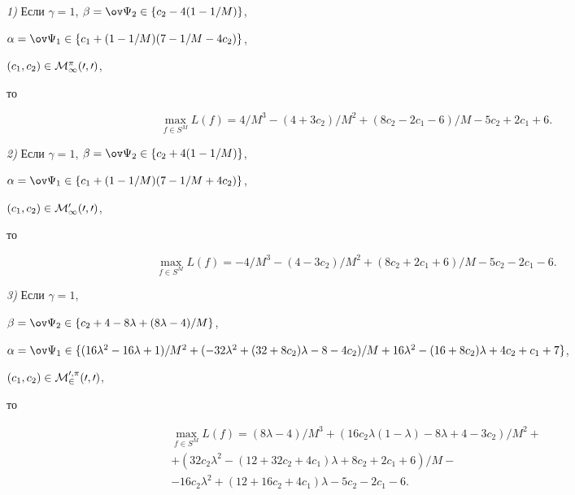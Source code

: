 \begin{thm}


{\em 1)} Если $\gamma=1$, $\beta=\ov\Psi_2\in\{c_2-4(1-1/M)\}$,


$\alpha=\ov\Psi_1\in\{c_1+(1-1/M)(7-1/M-4c_2)\}$,


$(c_1,c_2)\in\cal M^\pi_1(0,0)$,


то


\begin{equation}


\max_{f\in S^M}L(f)=4/M^3-(4+3c_2)/M^2+


(8c_2-2c_1-6)/M-5c_2+2c_1+6.


\end{equation}





{\em 2)} Если $\gamma=1$, $\beta=\ov\Psi_2\in\{c_2+4(1-1/M)\}$,


$\alpha=\ov\Psi_1\in\{c_1+(1-1/M)(7-1/M+4c_2)\}$,


$(c_1,c_2)\in\cal M^0_1(0,0)$,


то


\begin{equation}


\max_{f\in S^M}L(f)=-4/M^3-(4-3c_2)/M^2+


(8c_2+2c_1+6)/M-5c_2-2c_1-6.


\end{equation}





{\em 3)} Если $\gamma=1$,


$\beta=\ov\Psi_2\in\{c_2+4-8\lambda+(8\lambda-4)/M\}$,


$\alpha=\ov\Psi_1\in\{(16\lambda^2-16\lambda+1)/M^2+


(-32\lambda^2+(32+8c_2)\lambda-8-4c_2)/M+


16\lambda^2-(16+8c_2)\lambda+4c_2+c_1+7\}$,


$(c_1,c_2)\in\cal M^{0,\pi}_2(0,0)$,


то


\begin{multline}


\max_{f\in S^M}L(f)=(8\lambda-4)/M^3+


(16c_2\lambda(1-\lambda)-8\lambda+4-3c_2)/M^2+ \\


%


+(32c_2\lambda^2-(12+32c_2+4c_1)\lambda+8c_2+2c_1+6)/M- \\


%


-16c_2\lambda^2+(12+16c_2+4c_1)\lambda-5c_2-2c_1-6.


\end{multline}


\end{thm}





